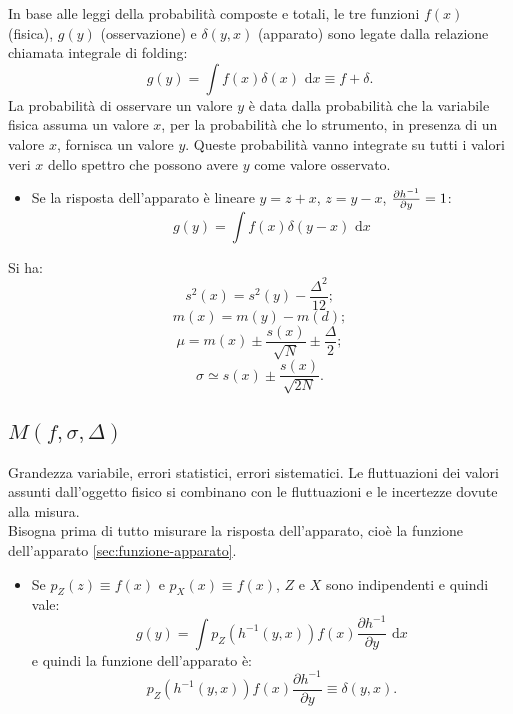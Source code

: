 In base alle leggi della probabilità composte e totali, le tre funzioni $f(x)$ (fisica), $g(y)$ (osservazione) e $\delta(y,x)$ (apparato) sono legate dalla relazione chiamata integrale di folding:
\[
g\left( y \right) =\int { f\left( x \right) \delta \left( x \right) \textrm{ d}x } \equiv f+\delta .
\]
La probabilità di osservare un valore $y$ è data dalla probabilità che la variabile fisica assuma un valore $x$, per la probabilità che lo strumento, in presenza di un valore $x$, fornisca un valore $y$. Queste probabilità vanno integrate su tutti i valori veri $x$ dello spettro che possono avere $y$ come valore osservato.
\begin{itemize}
\item Se la risposta dell'apparato è lineare $y=z+x$, $z=y-x$, $\frac { \partial { h }^{ -1 } }{ \partial y } =1\\ $:
\[
g\left( y \right) =\int { f\left( x \right) \delta \left( y-x \right) \textrm{ d}x } 
\]
\end{itemize}

Si ha:
\begin{equation}
{ s }^{ 2 }\left( x \right) ={ s }^{ 2 }\left( y \right) -\frac { { \Delta  }^{ 2 } }{ 12 } ;
\end{equation}
\begin{equation}
m\left( x \right) =m\left( y \right) -m\left( d \right) ;
\end{equation}
\begin{equation}
\mu =m\left( x \right) \pm \frac { s\left( x \right)  }{ \sqrt { N }  } \pm \frac { \Delta  }{ 2 } ;
\end{equation}
\begin{equation}
\sigma \simeq s\left( x \right) \pm \frac { s\left( x \right)  }{ \sqrt { 2N }  } .
\end{equation}

\subsection{$M\left( f,\sigma,\Delta \right) $} %
\label{subsec:fsD}
Grandezza variabile, errori statistici, errori sistematici. Le fluttuazioni dei valori assunti dall'oggetto fisico si combinano con le fluttuazioni e le incertezze dovute alla misura. 
\\ Bisogna prima di tutto misurare la risposta dell'apparato, cioè la funzione dell'apparato \ref{sec:funzione-apparato}.
\begin{itemize}
\item Se $p_Z(z)\equiv f(x)$ e $p_X(x)\equiv f(x)$, $Z$ e $X$ sono indipendenti e quindi vale:
\[
g\left( y \right) =\int { { p }_{ Z }\left( { h }^{ -1 }\left( y,x \right)  \right) f\left( x \right) \frac { \partial { h }^{ -1 } }{ \partial y } \textrm{ d}x } 
\]
e quindi la funzione dell'apparato è:
\[
{ p }_{ Z }\left( { h }^{ -1 }\left( y,x \right)  \right) f\left( x \right) \frac { \partial { h }^{ -1 } }{ \partial y } \equiv \delta \left( y,x \right) .
\]
\end{itemize}

